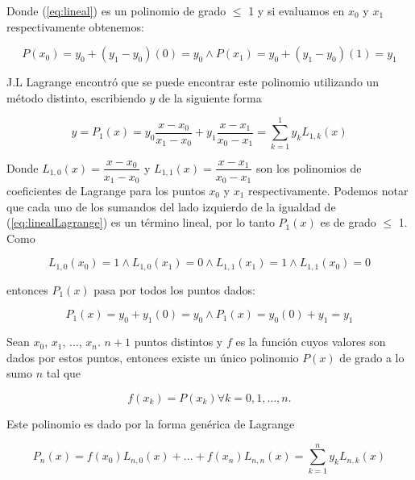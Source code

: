 Donde (\ref{eq:lineal}) es un polinomio de grado $\leq$ 1 y si evaluamos en $x_0$ y $x_1$ respectivamente obtenemos:

\begin{equation}
	 P(x_0) = y_0 + (y_1 - y_0)(0) = y_0 \wedge P(x_1) = y_0 + (y_1 - y_0)(1) = y_1 
\end{equation}

J.L Lagrange encontró que se puede encontrar este polinomio utilizando un método distinto, escribiendo $y$ de la siguiente forma

\begin{equation} \label{eq:linealLagrange}
	y = P_1(x) = y_0\dfrac{x - x_0}{x_1 - x_0} + y_1\dfrac{x - x_1}{x_0 - x_1} = \sum_{k=1}^{1} y_kL_{1,k}(x)
\end{equation}

Donde $L_{1,0}(x) = \dfrac{x - x_0}{x_1 - x_0}$ y $L_{1,1}(x) = \dfrac{x - x_1}{x_0 - x_1}$ son los polinomios de coeficientes de Lagrange para los puntos $x_0$ y $x_1$ respectivamente. Podemos notar que cada uno de los sumandos del lado izquierdo de la igualdad de (\ref{eq:linealLagrange}) es un término lineal, por lo tanto $P_1(x)$ es de grado $\leq$ 1. 
Como 

\begin{equation}
	L_{1,0}(x_0) = 1 \wedge L_{1,0}(x_1) = 0 \wedge L_{1,1}(x_1) = 1 \wedge L_{1,1}(x_0) = 0
\end{equation}

entonces $P_1(x)$ pasa por todos los puntos dados:

\begin{equation}
	P_1(x) = y_0 + y_1(0) = y_0 \wedge P_1(x) = y_0(0) + y_1 = y_1 
\end{equation}

\begin{theorem}
	\item Sean $x_0$, $x_1$, $\dots$, $x_n$. $n + 1$ puntos distintos y $f$ es la función cuyos valores son dados por estos puntos, entonces existe un único polinomio $P(x)$ de grado a lo sumo $n$ tal que 
\end{theorem}
\begin{equation}
	f(x_k) = P(x_k) \forall k = 0, 1, \dots, n.
\end{equation}

Este polinomio es dado por la forma genérica de Lagrange

\begin{equation}
	P_n(x) = f(x_0)L_{n, 0}(x) + \dots + f(x_n)L_{n,n}(x) = \sum_{k=1}^{n} y_kL_{n,k}(x) 
\end{equation}

